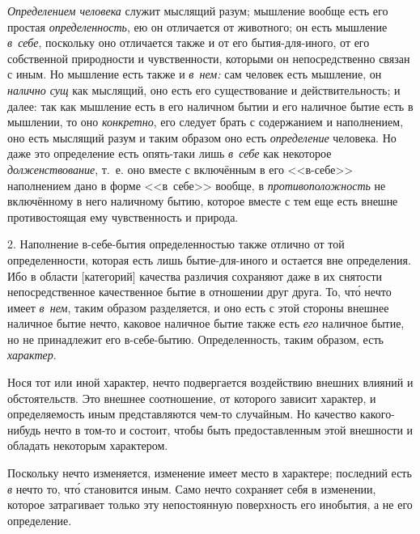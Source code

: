 {\em Определением человека} служит мыслящий разум;
мышление вообще есть его простая {\em определенность},
ею он отличается от животного; он есть мышление {\em в~себе},
поскольку оно отличается также и от его бытия-для-иного, от его
собственной природности и чувственности, которыми он непосредственно связан
с иным. Но мышление есть также и {\em в~нем:} сам
человек есть мышление, он {\em налично сущ} как
мыслящий, оно есть его существование и действительность; и далее: так как
мышление есть в его наличном бытии и его наличное бытие есть в мышлении, то
оно {\em конкретно}, его следует брать с содержанием и
наполнением, оно есть мыслящий разум и таким образом оно есть
{\em определение} человека. Но даже это определение
есть опять-таки лишь {\em в~себе} как некоторое
{\em долженствование}, т.~е. оно вместе с включённым
в его <<в-себе>> наполнением дано в форме <<в~себе>>
вообще, в {\em противоположность} не включённому
в него наличному бытию, которое вместе с тем еще
есть внешне противостоящая ему чувственность и природа.

2. Наполнение в-себе-бытия определенностью также отлично от той
определенности, которая есть лишь бытие-для-иного и остается вне
определения. Ибо в области [категорий] качества различия сохраняют даже в
их снятости непосредственное качественное бытие в отношении друг друга. То,
чт\'{о} нечто имеет {\em в~нем}, таким образом разделяется,
и оно есть с этой стороны внешнее наличное бытие нечто, каковое наличное
бытие также есть {\em его} наличное бытие, но не
принадлежит его в-себе-бытию. Определенность, таким образом, есть
{\em характер}.

Нося тот или иной характер, нечто подвергается воздействию внешних влияний
и обстоятельств. Это внешнее соотношение, от которого зависит характер, и
определяемость иным представляются чем-то случайным. Но
качество какого-нибудь нечто в том-то и состоит, чтобы быть предоставленным
этой внешности и обладать некоторым характером.

Поскольку нечто изменяется, изменение имеет место в характере; последний
есть {\em в} нечто то, чт\'{о} становится иным.
Само нечто сохраняет себя в изменении, которое затрагивает только эту
непостоянную поверхность его инобытия, а не его определение.

